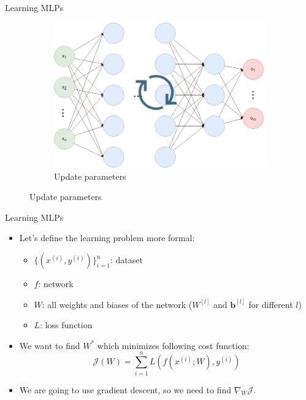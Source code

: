 \documentclass[compress,oilve,t]{beamer}
\begin{document}
\begin{frame}{Learning MLPs}
\begin{figure}
\begin{subfigure}[b]{0.28\textwidth}
			\includegraphics[width=\textwidth]{Figs/update_phase.png}
			\caption{Update parameters}
		\end{subfigure}
	\end{figure}
\end{frame}

\begin{frame}{Learning MLPs}
	\begin{itemize}
		\item Let's define the learning problem more formal:
		\begin{itemize}
			\item $\{(x^{(i)}, y^{(i)})\}_{i=1}^{n}$: dataset
			\item $f$: network
			\item $W$: all weights and biases of the network ($W^{[l]}$ and $\bm{b}^{[l]}$ for different $l$)
			\item $L$: loss function
		\end{itemize}
		\medskip
		\item We want to find $W^{\ast}$ which minimizes following cost function:
		\[
		\mathcal{J}(W) = \sum_{i=1}^{n} L\left(f(x^{(i)}; W), y^{(i)}\right)
		\]
		\item We are going to use gradient descent, so we need to find $\nabla_W \mathcal{J}$.
	\end{itemize}
\end{frame}
\end{document}
